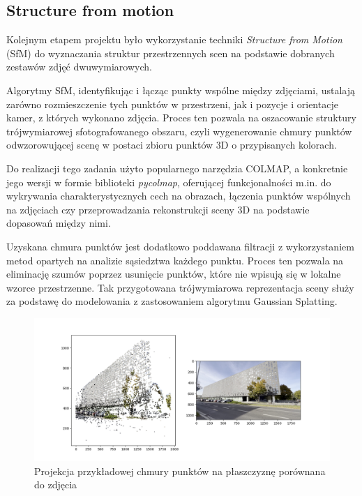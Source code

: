 \subsection{Structure from motion}
Kolejnym etapem projektu było wykorzystanie techniki \textit{Structure from Motion} (SfM) do wyznaczania
struktur przestrzennych scen na podstawie dobranych zestawów zdjęć dwuwymiarowych. 

Algorytmy SfM, identyfikując i łącząc 
punkty wspólne między zdjęciami, ustalają zarówno rozmieszczenie tych punktów w przestrzeni, jak i pozycje 
i orientacje kamer, z których wykonano zdjęcia. Proces ten pozwala na oszacowanie struktury trójwymiarowej
sfotografowanego obszaru, czyli wygenerowanie chmury punktów odwzorowującej scenę w postaci 
zbioru punktów 3D o przypisanych kolorach. 

Do realizacji tego zadania użyto popularnego narzędzia COLMAP, a konkretnie jego wersji w formie biblioteki 
\textit{pycolmap}, oferującej funkcjonalności m.in. do wykrywania charakterystycznych cech na obrazach, 
łączenia punktów wspólnych na zdjęciach czy przeprowadzania rekonstrukcji sceny 3D na podstawie dopasowań 
między nimi.

Uzyskana chmura punktów jest dodatkowo poddawana filtracji z wykorzystaniem metod opartych na analizie 
sąsiedztwa każdego punktu. Proces ten pozwala na eliminację szumów poprzez usunięcie punktów, które nie 
wpisują się w lokalne wzorce przestrzenne. Tak przygotowana trójwymiarowa reprezentacja sceny służy za 
podstawę do modelowania z zastosowaniem algorytmu Gaussian Splatting.

\begin{figure}[!ht]
    \centering
    \includegraphics[width=0.9\linewidth]{images/sfm.png}
    \caption{Projekcja przykładowej chmury punktów na płaszczyznę porównana do zdjęcia}
\end{figure}